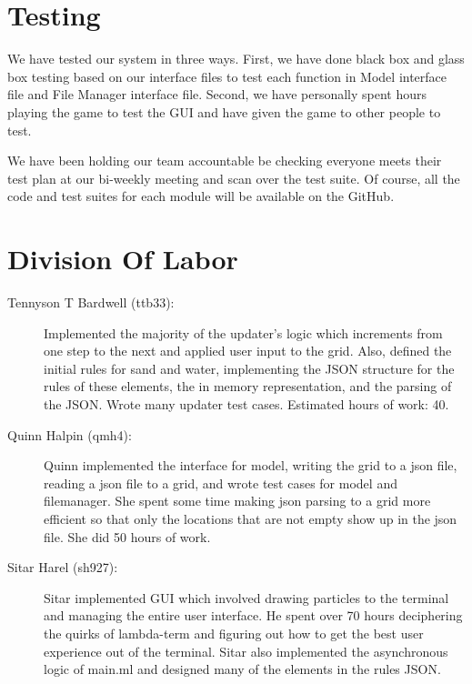 \section{Testing}
We have tested our system in three ways. First, we have done black box and glass box testing based on our interface files to test each function in Model interface file and File Manager interface file. Second, we have
personally spent hours playing the game to test the GUI and have given the game to other people to test. 

We have been holding our team accountable be checking everyone meets their test plan at our bi-weekly meeting and scan over the test suite. Of course, all the code and test suites for each module will be available on the GitHub.

\section{Division Of Labor}

\begin{description}
  \item[Tennyson T Bardwell (ttb33):]
    Implemented the majority of the updater's logic which increments from one step to the next and applied user input to the grid. Also, defined the initial rules for sand and water, implementing the JSON structure for the rules of these elements, the in memory representation, and the parsing of the JSON. Wrote many updater test cases. Estimated hours of work: 40.
  \item[Quinn Halpin (qmh4):]
    Quinn implemented the interface for model, writing the grid to a json file, 
    reading a json file to a grid, and wrote test cases for model and filemanager. 
    She spent some time making json parsing to a grid more efficient so that only the 
    locations that are not empty show up in the json file. She did 50 hours of work.
  \item[Sitar Harel (sh927):]
    Sitar implemented GUI which involved drawing particles to the terminal and 
    managing the entire user interface. He spent over 70 hours deciphering the quirks 
    of lambda-term and figuring out how to get the best user experience out of the terminal.
    Sitar also implemented the asynchronous logic of main.ml and designed many of 
    the elements in the rules JSON.
\end{description}



